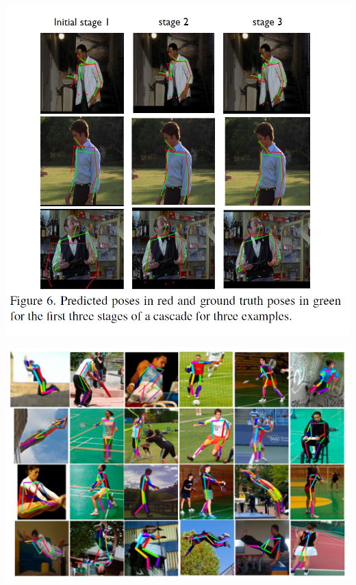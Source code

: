 \begin{frame}[allowframebreaks]
\begin{center}
	\includegraphics[scale=0.6]{figs/Deeppose_results1}
\end{center}

\framebreak

\begin{center}
	\includegraphics[scale=0.5]{figs/Deeppose_results2}
\end{center}





\end{frame}


